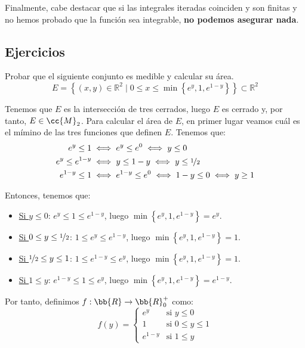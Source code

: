 Finalmente, cabe destacar que si las integrales iteradas coinciden y son finitas y no hemos probado que la función sea integrable, \textbf{no podemos asegurar nada}.


\subsection{Ejercicios}
\begin{ejercicio}
    Probar que el siguiente conjunto es medible y calcular su área.
    \[ E = \left\{ (x, y) \in \mathbb{R}^2 \mid 0 \leq x \leq \min \left\{ e^y , 1 , e^{1-y} \right\} \right\} \subset \mathbb{R}^2 \]

    Tenemos que $E$ es la intersección de tres cerrados, luego $E$ es cerrado y, por tanto, $E\in \cc{M}_2$.
    Para calcular el área de $E$, en primer lugar veamos cuál es el mímino de las tres funciones que definen $E$.
    Tenemos que:
    \begin{align*}
        e^y \leq 1 &\iff e^y \leq e^0 \iff y \leq 0 \\
        e^y \leq e^{1-y} &\iff y \leq 1-y \iff y \leq \nicefrac{1}{2} \\
        e^{1-y} \leq 1 &\iff e^{1-y} \leq e^0 \iff 1-y \leq 0 \iff y \geq 1
    \end{align*}

    Entonces, tenemos que:
    \begin{itemize}
        \item \ul{Si $y \leq 0$}: $e^y \leq 1\leq e^{1-y}$, luego $\min \left\{ e^y , 1 , e^{1-y} \right\} = e^y$.
        \item \ul{Si $0 \leq y \leq \nicefrac{1}{2}$}: $1\leq e^y \leq e^{1-y}$, luego $\min \left\{ e^y , 1 , e^{1-y} \right\} = 1$.
        \item \ul{Si $\nicefrac{1}{2} \leq y \leq 1$}: $1\leq e^{1-y} \leq e^y$, luego $\min \left\{ e^y , 1 , e^{1-y} \right\} = 1$.
        \item \ul{Si $1\leq y$}: $e^{1-y}\leq 1 \leq e^{y}$, luego $\min \left\{ e^y , 1 , e^{1-y} \right\} = e^{1-y}$.
    \end{itemize}

    Por tanto, definimos $f:\bb{R} \to \bb{R}_0^+$ como:
    \[ f(y) = \begin{cases}
        e^y & \text{si } y \leq 0 \\
        1 & \text{si } 0 \leq y \leq 1 \\
        e^{1-y} & \text{si } 1 \leq y
    \end{cases} \]


\end{ejercicio}
